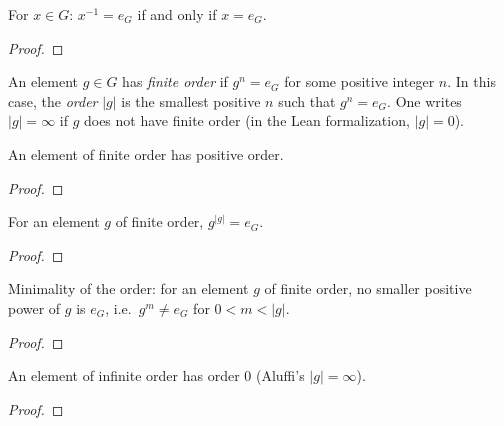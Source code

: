 \begin{proposition}
  \label{prop:groups:inv-eq-e-iff}
  \leanok
  For $x \in G$: $x^{-1} = e_G$ if and only if $x = e_G$.
\end{proposition}
\begin{proof}
  \leanok
\end{proof}

\begin{definition}
  \label{def:groups:order-element}
  \leanok
  An element $g \in G$ has \emph{finite order} if $g^n = e_G$ for some
  positive integer $n$. In this case, the \emph{order} $|g|$ is the
  smallest positive $n$ such that $g^n = e_G$. One writes
  $|g| = \infty$ if $g$ does not have finite order (in the Lean
  formalization, $|g| = 0$).
\end{definition}

\begin{proposition}
  \label{prop:groups:order-pos}
  \leanok
  An element of finite order has positive order.
\end{proposition}
\begin{proof}
  \leanok
\end{proof}

\begin{proposition}
  \label{prop:groups:gpow-order}
  \leanok
  For an element $g$ of finite order, $g^{|g|} = e_G$.
\end{proposition}
\begin{proof}
  \leanok
\end{proof}

\begin{proposition}
  \label{prop:groups:gpow-ne-e-of-lt-order}
  \leanok
  Minimality of the order: for an element $g$ of finite order, no
  smaller positive power of $g$ is $e_G$, i.e.\ $g^m \neq e_G$ for
  $0 < m < |g|$.
\end{proposition}
\begin{proof}
  \leanok
\end{proof}

\begin{proposition}
  \label{prop:groups:order-eq-zero-of-infinite}
  \leanok
  An element of infinite order has order $0$ (Aluffi's $|g| = \infty$).
\end{proposition}
\begin{proof}
  \leanok
\end{proof}

